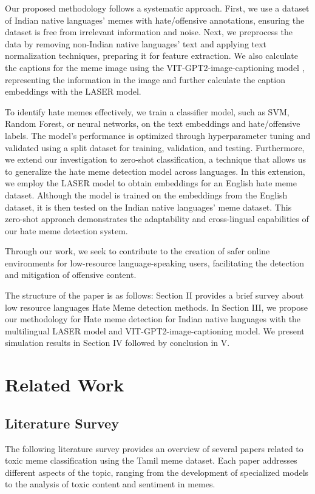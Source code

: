 \documentclass{ieeeaccess}
\begin{document}
Our proposed methodology follows a systematic approach. First, we use a dataset of Indian native languages' memes with hate/offensive annotations, ensuring the dataset is free from irrelevant information and noise. Next, we preprocess the data by removing non-Indian native languages' text and applying text normalization techniques, preparing it for feature extraction. We also calculate the captions for the meme image using the VIT-GPT2-image-captioning model \cite{b2}, representing the information in the image and further calculate the caption embeddings with the LASER model.

To identify hate memes effectively, we train a classifier model, such as SVM, Random Forest, or neural networks, on the text embeddings and hate/offensive labels. The model's performance is optimized through hyperparameter tuning and validated using a split dataset for training, validation, and testing. Furthermore, we extend our investigation to zero-shot classification, a technique that allows us to generalize the hate meme detection model across languages. In this extension, we employ the LASER model to obtain embeddings for an English hate meme dataset. Although the model is trained on the embeddings from the English dataset, it is then tested on the Indian native languages' meme dataset. This zero-shot approach demonstrates the adaptability and cross-lingual capabilities of our hate meme detection system.

Through our work, we seek to contribute to the creation of safer online environments for low-resource language-speaking users, facilitating the detection and mitigation of offensive content.

The structure of the paper is as follows: Section II provides a brief survey about low resource languages Hate Meme detection methods. In Section III, we propose our methodology for Hate meme detection for Indian native languages with the multilingual LASER model and VIT-GPT2-image-captioning model. We present simulation results in Section IV followed by conclusion in V.

\section{Related Work}
\label{sec:related_work}

\subsection{Literature Survey}
The following literature survey provides an overview of several papers related to toxic meme classification using the Tamil meme dataset. Each paper addresses different aspects of the topic, ranging from the development of specialized models to the analysis of toxic content and sentiment in memes.
\end{document}
